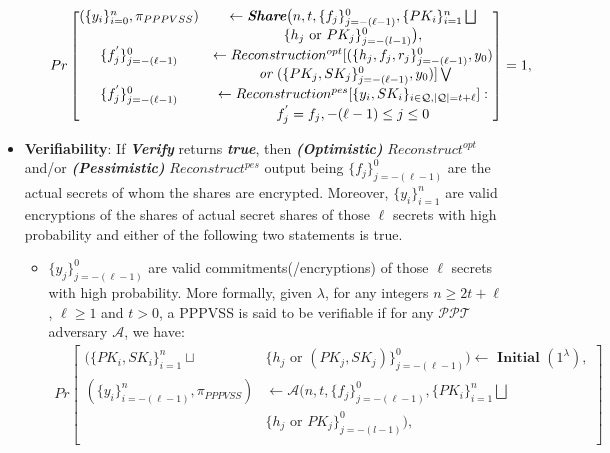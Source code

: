 \begin{itemize}
\begin{itemize}
        \begin{align*}
          Pr\begin{bmatrix}
            (\{y_i\}_{i=0}^n,\pi_{PPPVSS})&\leftarrow \textit{\textbf{Share}} \big(n,t,\{f_j\}_{j=-(\ell-1)}^0,\{PK_i\}_{i=1}^n\bigsqcup\\
            &\{h_j\text{ or }PK_j\}_{j=-(l-1)}^0\big),\\
            \{f_j^{'}\}_{j=-(\ell-1)}^0&\leftarrow Reconstruction^{opt}[(\{h_j,f_j,r_j\}_{j=-(\ell-1)}^0,y_0)\\
            &\textit{ or }(\{PK_j,SK_j\}_{j=-(\ell-1)}^0,y_0)]\bigvee\\
            \{f_j^{'}\}_{j=-(\ell-1)}^0&\leftarrow Reconstruction^{pes}[\{y_i,SK_i\}_{i\in\mathcal{Q},|\mathcal{Q}|=t+\ell}]:\\
            &f_j^{'}=f_j,-(\ell-1)\leq j\leq 0
          \end{bmatrix} = 1,
        \end{align*}
    \end{itemize}
  \item \textbf{Verifiability}: If \textit{\textbf{Verify}} returns \textit{\textbf{true}}, then 
    \textit{\textbf{(Optimistic)}} $Reconstruct^{opt}$ and/or \textit{\textbf{(Pessimistic)}} $Reconstruct^{pes}$ 
    output being $\{f_j\}_{j=-(\ell-1)}^0$ are the actual secrets of whom the shares are encrypted. Moreover, 
    $\{y_i\}_{i=1}^n$ are valid encryptions of the shares of actual secret shares of those $\ell$ secrets with 
    high probability and either of the following two statements is true.
    \begin{itemize}
      \item $\{y_j\}_{j=-(\ell-1)}^0$ are valid commitments(/encryptions) of those $\ell$ secrets with high 
        probability. More formally, given $\lambda$, for any integers 
        $n\geq 2t+\ell$, $\ell\geq 1$ and $t>0$, a PPPVSS is said to be verifiable if for any 
        $\mathcal{PPT}$ adversary $\mathcal{A}$, we have:
        \begin{align*}
          Pr\begin{bmatrix}
            \big(\{PK_i,SK_i\}_{i=1}^n\sqcup&\{h_j\text{ or }(PK_j,SK_j)\}_{j=-(\ell-1)}^0\big)\leftarrow\textbf{ Initial } (1^\lambda),\\
            (\{y_i\}_{i=-(\ell-1)}^n,\pi_{PPPVSS})&\leftarrow \mathcal{A} \big(n,t,\{f_j\}_{j=-(\ell-1)}^0,\{PK_i\}_{i=1}^n\bigsqcup\\
            &\{h_j\text{ or }PK_j\}_{j=-(l-1)}^0\big),\\

\end{bmatrix}
\end{align*}
\end{itemize}
\end{itemize}
